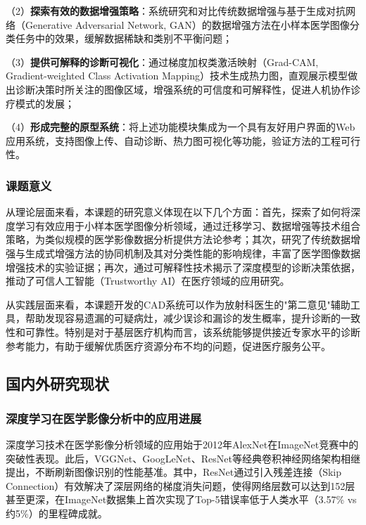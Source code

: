 （2）\textbf{探索有效的数据增强策略}：系统研究和对比传统数据增强与基于生成对抗网络（Generative Adversarial Network, GAN）的数据增强方法在小样本医学图像分类任务中的效果，缓解数据稀缺和类别不平衡问题；

（3）\textbf{提供可解释的诊断可视化}：通过梯度加权类激活映射（Grad-CAM, Gradient-weighted Class Activation Mapping）技术生成热力图，直观展示模型做出诊断决策时所关注的图像区域，增强系统的可信度和可解释性，促进人机协作诊疗模式的发展；

（4）\textbf{形成完整的原型系统}：将上述功能模块集成为一个具有友好用户界面的Web应用系统，支持图像上传、自动诊断、热力图可视化等功能，验证方法的工程可行性。

\subsubsection{课题意义}

从理论层面来看，本课题的研究意义体现在以下几个方面：首先，探索了如何将深度学习有效应用于小样本医学图像分析领域，通过迁移学习、数据增强等技术组合策略，为类似规模的医学影像数据分析提供方法论参考；其次，研究了传统数据增强与生成式增强方法的协同机制及其对分类性能的影响规律，丰富了医学图像数据增强技术的实验证据；再次，通过可解释性技术揭示了深度模型的诊断决策依据，推动了可信人工智能（Trustworthy AI）在医疗领域的应用研究。

从实践层面来看，本课题开发的CAD系统可以作为放射科医生的"第二意见"辅助工具，帮助发现容易遗漏的可疑病灶，减少误诊和漏诊的发生概率，提升诊断的一致性和可靠性。特别是对于基层医疗机构而言，该系统能够提供接近专家水平的诊断参考能力，有助于缓解优质医疗资源分布不均的问题，促进医疗服务公平。


\subsection{国内外研究现状}

\subsubsection{深度学习在医学影像分析中的应用进展}

深度学习技术在医学影像分析领域的应用始于2012年AlexNet在ImageNet竞赛中的突破性表现\cite{krizhevsky2012imagenet}。此后，VGGNet\cite{simonyan2014very}、GoogLeNet\cite{szegedy2015going}、ResNet\cite{he2016deep}等经典卷积神经网络架构相继提出，不断刷新图像识别的性能基准。其中，ResNet通过引入残差连接（Skip Connection）有效解决了深层网络的梯度消失问题，使得网络层数可以达到152层甚至更深，在ImageNet数据集上首次实现了Top-5错误率低于人类水平（3.57\% vs 约5\%）的里程碑成就。

